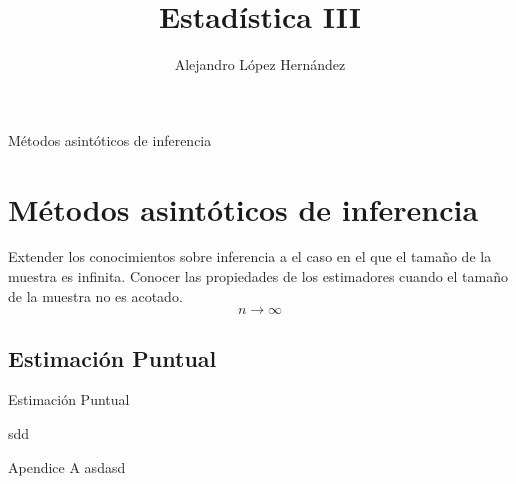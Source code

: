 \documentclass{beamer}
\author[Alejandro López]{Alejandro López Hernández}
\institute[FES Acatlán UNAM ]
{ FES Acatlán\\
  Universidad Nacional Autónoma de México }
\title{Estadística III}
\begin{document}
\frame{\titlepage}
\frame{\tableofcontents}
\begin{frame}{Métodos asintóticos de inferencia}
\section{Métodos asintóticos de inferencia}
Extender los conocimientos sobre inferencia a el caso en el que el tamaño de la muestra es infinita. Conocer las propiedades de los estimadores cuando el tamaño de la muestra no es acotado.$$n\rightarrow \infty$$
\end{frame}
\subsection{Estimación Puntual}
\begin{frame}{Estimación Puntual}

sdd
\end{frame}
\appendix
\begin{frame}{Apendice A} 
asdasd
\end{frame}
\end{document}
